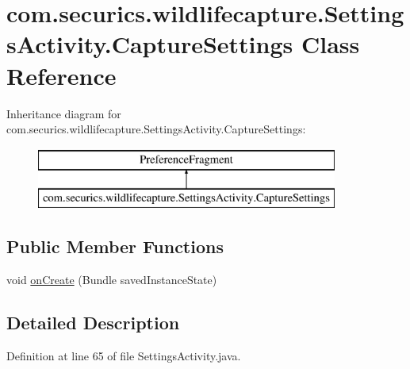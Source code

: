 \hypertarget{classcom_1_1securics_1_1wildlifecapture_1_1_settings_activity_1_1_capture_settings}{\section{com.\+securics.\+wildlifecapture.\+Settings\+Activity.\+Capture\+Settings Class Reference}
\label{classcom_1_1securics_1_1wildlifecapture_1_1_settings_activity_1_1_capture_settings}
}
Inheritance diagram for com.\+securics.\+wildlifecapture.\+Settings\+Activity.\+Capture\+Settings\+:\begin{figure}[H]
\begin{center}
\leavevmode
\includegraphics[height=2.000000cm]{classcom_1_1securics_1_1wildlifecapture_1_1_settings_activity_1_1_capture_settings}
\end{center}
\end{figure}
\subsection*{Public Member Functions}
\begin{DoxyCompactItemize}
\item 
void \hyperlink{classcom_1_1securics_1_1wildlifecapture_1_1_settings_activity_1_1_capture_settings_a8a308294415f483c1b70a8c49426e28e}{on\+Create} (Bundle saved\+Instance\+State)
\end{DoxyCompactItemize}


\subsection{Detailed Description}


Definition at line 65 of file Settings\+Activity.\+java.



